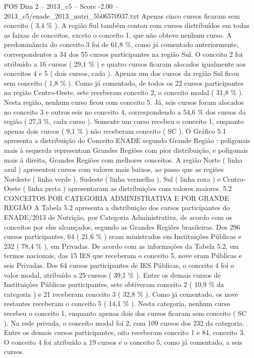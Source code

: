 \begin{textsample}{POS Dim 2 – 2013\_c5 – Score -2.00 – 2013\_c5/enade\_2013\_nutri\_5b06570937.txt}
Apenas cinco cursos ficaram sem conceito ( 3,4 \% ).
A região Sul também contou com cursos distribuídos em todas as faixas de conceitos, exceto o conceito 1, que não obteve nenhum curso.
A predominância do conceito 3 foi de 61,8 \%, como já comentado anteriormente, correspondentes a 34 dos 55 cursos participantes na região Sul.
O conceito 2 foi atribuído a 16 cursos ( 29,1 \% ) e quatro cursos ficaram alocados igualmente aos conceitos 4 e 5 ( dois cursos, cada ).
Apenas um dos cursos da região Sul ficou sem conceito ( 1,8 \% ).
Como já comentado, de todos os 22 cursos participantes na região Centro-Oeste, sete receberam conceito 2, o conceito modal ( 31,8 \% ).
Nesta região, nenhum curso ficou com conceito 5.
Já, seis cursos foram alocados no conceito 3 e outros seis no conceito 4, correspondendo a 54,6 \% dos cursos da região ( 27,3 \%, cada curso ).
Somente um curso recebeu o conceito 1, enquanto apenas dois cursos ( 9,1 \% ) não receberam conceito ( SC ).
O Gráfico 5.1 apresenta a distribuição do Conceito ENADE segundo Grande Região : poligonais mais à esquerda representam Grandes Regiões com pior distribuição, e poligonais mais à direita, Grandes Regiões com melhores conceitos.
A região Norte ( linha azul ) apresentou cursos com valores mais baixos, ao passo que as regiões Nordeste ( linha verde ), Sudeste ( linha vermelha ), Sul ( linha roxa ) e Centro-Oeste ( linha preta ) apresentaram as distribuições com valores maiores. 5.2 CONCEITOS POR CATEGORIA ADMINISTRATIVA E POR GRANDE REGIÃO A Tabela 5.2 apresenta a distribuição dos cursos participantes do ENADE/2013 de Nutrição, por Categoria Administrativa, de acordo com os conceitos por eles alcançados, segundo as Grandes Regiões brasileiras.
Dos 296 cursos participantes, 64 ( 21,6 \% ) eram ministrados em Instituições Públicas e 232 ( 78,4 \% ), em Privadas.
De acordo com as informações da Tabela 5.2, em termos nacionais, das 15 IES que receberam o conceito 5, nove eram Públicas e seis Privadas.
Dos 64 cursos participantes de IES Públicas, o conceito 4 foi o valor modal, atribuído a 25 cursos ( 39,1 \% ).
Entre os demais cursos de Instituições Públicas participantes, sete obtiveram conceito 2 ( 10,9 \% da categoria ) e 21 receberam conceito 3 ( 32,8 \% ).
Como já comentado, os nove restantes receberam o conceito 5 ( 14,1 \% ).
Nesta categoria, nenhum curso recebeu o conceito 1, enquanto apenas dois dos cursos ficaram sem conceito ( SC ).
Na rede privada, o conceito modal foi 2, com 109 cursos dos 232 da categoria.
Entre os demais cursos participantes, oito receberam conceito 1 e 84, conceito 3.
O conceito 4 foi atribuído a 19 cursos e o conceito 5, como já comentado, a seis cursos.

\end{textsample}
